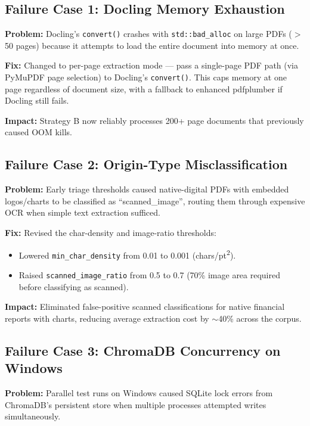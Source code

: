\documentclass[12pt,a4paper]{article}
\begin{document}
\subsection{Failure Case 1: Docling Memory Exhaustion}

\textbf{Problem:} Docling's \texttt{convert()} crashes with
\texttt{std::bad\_alloc} on large PDFs ($>$50 pages) because it
attempts to load the entire document into memory at once.

\textbf{Fix:} Changed to per-page extraction mode — pass a single-page
PDF path (via PyMuPDF page selection) to Docling's \texttt{convert()}.
This caps memory at one page regardless of document size, with a fallback
to enhanced pdfplumber if Docling still fails.

\textbf{Impact:} Strategy B now reliably processes 200+ page documents
that previously caused OOM kills.

\subsection{Failure Case 2: Origin-Type Misclassification}

\textbf{Problem:} Early triage thresholds caused native-digital PDFs
with embedded logos/charts to be classified as ``scanned\_image'',
routing them through expensive OCR when simple text extraction sufficed.

\textbf{Fix:} Revised the char-density and image-ratio thresholds:
\begin{itemize}[nosep]
    \item Lowered \texttt{min\_char\_density} from 0.01 to 0.001
          (chars/pt\textsuperscript{2}).
    \item Raised \texttt{scanned\_image\_ratio} from 0.5 to 0.7
          (70\% image area required before classifying as scanned).
\end{itemize}

\textbf{Impact:} Eliminated false-positive scanned classifications for
native financial reports with charts, reducing average extraction cost by
$\sim$40\% across the corpus.

\subsection{Failure Case 3: ChromaDB Concurrency on Windows}

\textbf{Problem:} Parallel test runs on Windows caused SQLite lock
errors from ChromaDB's persistent store when multiple processes
attempted writes simultaneously.
\end{document}
